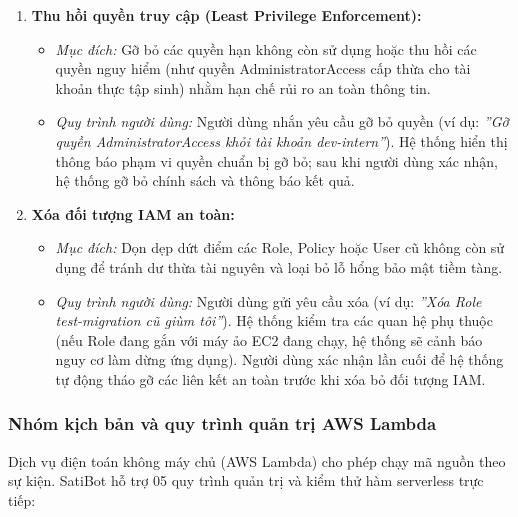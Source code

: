 \documentclass[a4paper,12pt]{article}
\begin{document}
\begin{enumerate}
  \item \textbf{Thu hồi quyền truy cập (Least Privilege Enforcement):}
  \begin{itemize}
    \item \textit{Mục đích:} Gỡ bỏ các quyền hạn không còn sử dụng hoặc thu hồi các quyền nguy hiểm (như quyền AdministratorAccess cấp thừa cho tài khoản thực tập sinh) nhằm hạn chế rủi ro an toàn thông tin.
    \item \textit{Quy trình người dùng:} Người dùng nhắn yêu cầu gỡ bỏ quyền (ví dụ: \textit{''Gỡ quyền AdministratorAccess khỏi tài khoản dev-intern''}). Hệ thống hiển thị thông báo phạm vi quyền chuẩn bị gỡ bỏ; sau khi người dùng xác nhận, hệ thống gỡ bỏ chính sách và thông báo kết quả.
  \end{itemize}

  \item \textbf{Xóa đối tượng IAM an toàn:}
  \begin{itemize}
    \item \textit{Mục đích:} Dọn dẹp dứt điểm các Role, Policy hoặc User cũ không còn sử dụng để tránh dư thừa tài nguyên và loại bỏ lỗ hổng bảo mật tiềm tàng.
    \item \textit{Quy trình người dùng:} Người dùng gửi yêu cầu xóa (ví dụ: \textit{''Xóa Role test-migration cũ giùm tôi''}). Hệ thống kiểm tra các quan hệ phụ thuộc (nếu Role đang gắn với máy ảo EC2 đang chạy, hệ thống sẽ cảnh báo nguy cơ làm dừng ứng dụng). Người dùng xác nhận lần cuối để hệ thống tự động tháo gỡ các liên kết an toàn trước khi xóa bỏ đối tượng IAM.
  \end{itemize}
\end{enumerate}

\subsubsection{Nhóm kịch bản và quy trình quản trị AWS Lambda}

Dịch vụ điện toán không máy chủ (AWS Lambda) cho phép chạy mã nguồn theo sự kiện. SatiBot hỗ trợ 05 quy trình quản trị và kiểm thử hàm serverless trực tiếp:
\end{document}
